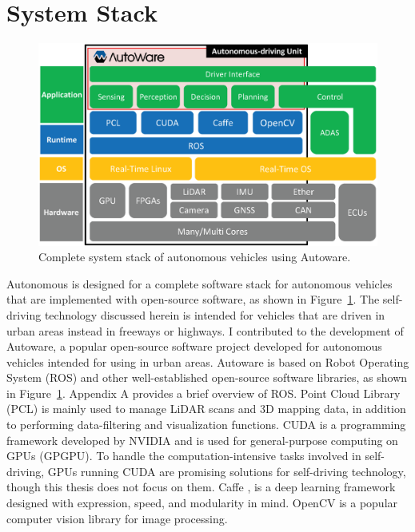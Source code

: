 \section{System Stack}

\begin{figure}[thbp]
  \centering
  \includegraphics[width=0.9\linewidth]{../figure/Autoware/system_stack.eps}
  \caption{\label{fig:system_stack}
  Complete system stack of autonomous vehicles using Autoware.}
\end{figure}

Autonomous is designed for a complete software stack for autonomous vehicles that are implemented with open-source software, as shown in
Figure~\ref{fig:system_stack}.
The self-driving technology discussed herein is intended for vehicles that are driven in
urban areas instead in freeways or highways.
I contributed to the development of Autoware, a popular
open-source software project developed for autonomous
vehicles intended for using in urban areas.
Autoware is based on Robot Operating System (ROS) and other
well-established open-source software libraries, as shown in
Figure~\ref{fig:system_stack}.
Appendix A provides a brief overview of ROS.
Point Cloud Library (PCL) \cite{pcl} is mainly used to manage LiDAR
scans and 3D mapping data, in addition to performing data-filtering and visualization functions.
CUDA \cite{cuda} is a programming framework developed by NVIDIA and is used for general-purpose
computing on GPUs (GPGPU).
To handle the computation-intensive tasks involved in self-driving, GPUs running CUDA are
promising solutions for self-driving technology, though this thesis does
not focus on them.
Caffe \cite{jia2014caffe}, \cite{caffe} is a deep learning
framework designed with expression, speed, and modularity in mind.
OpenCV \cite{opencv} is a popular computer vision library for image
processing.

